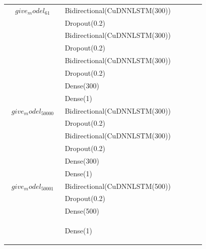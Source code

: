 \begin{longtable}{| c | m{0.58\linewidth} | r | m{0.1\linewidth} |}
    $give_model_61$                & Bidirectional(CuDNNLSTM(300)) \\
                                   & Dropout(0.2)                  \\
                                   & Bidirectional(CuDNNLSTM(300)) \\
                                   & Dropout(0.2)                  \\
                                   & Bidirectional(CuDNNLSTM(300)) \\
                                   & Dropout(0.2)                  \\
                                   & Dense(300)                    \\
                                   & Dense(1)                      \\ \hline

    $give_model_50000$             & Bidirectional(CuDNNLSTM(300)) \\
                                   & Dropout(0.2)                  \\
                                   & Bidirectional(CuDNNLSTM(300)) \\
                                   & Dropout(0.2)                  \\
                                   & Dense(300)                    \\
                                   & Dense(1)                      \\ \hline

    $give_model_50001$             & Bidirectional(CuDNNLSTM(500)) \\
                                   & Dropout(0.2)                  \\
                                   & Dense(500)                    \\
                                   & Dense(1)                      %

    \label{table:sieci}
\end{longtable}



